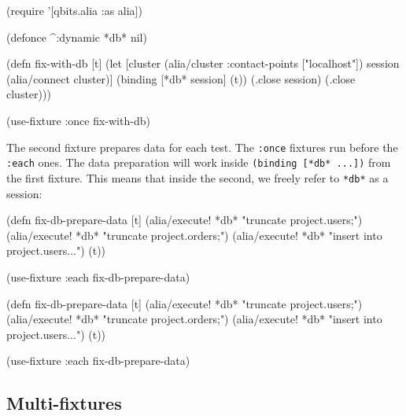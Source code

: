 \begin{english}
  \begin{clojure}
(require '[qbits.alia :as alia])

(defonce ^:dynamic *db* nil)

(defn fix-with-db [t]
  (let [cluster (alia/cluster {:contact-points ["localhost"]})
        session (alia/connect cluster)]
    (binding [*db* session]
      (t))
    (.close session)
    (.close cluster)))

(use-fixture :once fix-with-db)
  \end{clojure}
\end{english}

\fi

The second fixture prepares data for each test. The \verb|:once| fixtures run before the \verb|:each| ones. The data preparation will work inside \verb|(binding [*db* ...])| from the first fixture. This means that inside the second, we freely refer to \verb|*db*| as a session:


\ifx\DEVICETYPE\MOBILE

\begin{english}
  \begin{clojure}
(defn fix-db-prepare-data [t]
  (alia/execute! *db*
    "truncate project.users;")
  (alia/execute! *db*
    "truncate project.orders;")
  (alia/execute! *db*
    "insert into project.users...")
  (t))

(use-fixture :each fix-db-prepare-data)
  \end{clojure}
\end{english}

\else

\begin{english}
  \begin{clojure}
(defn fix-db-prepare-data [t]
  (alia/execute! *db* "truncate project.users;")
  (alia/execute! *db* "truncate project.orders;")
  (alia/execute! *db* "insert into project.users...")
  (t))

(use-fixture :each fix-db-prepare-data)
  \end{clojure}
\end{english}

\fi

\subsection{Multi-fixtures}

\label{multi-fixture}

